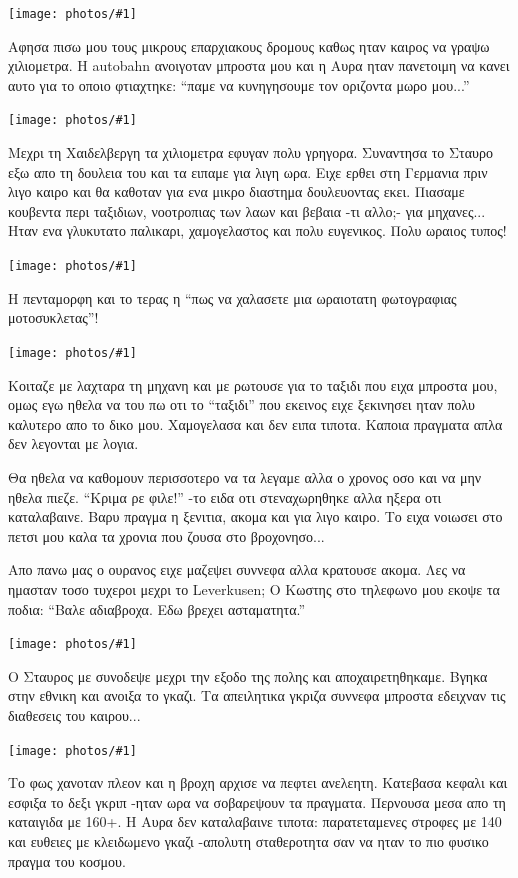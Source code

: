 \documentclass[11pt, letterpaper]{book}
\newcommand\photo[1]{\begin{center}\noindent\texttt{[image: photos/\#1]}\end{center}}
\begin{document}
\photo{117.jpg}

Αφησα πισω μου τους μικρους επαρχιακους δρομους καθως ηταν καιρος να γραψω χιλιομετρα. Η autobahn ανοιγοταν μπροστα μου και η Αυρα ηταν πανετοιμη να κανει αυτο για το οποιο φτιαχτηκε: ``παμε να κυνηγησουμε τον οριζοντα μωρο μου...''

\photo{118.jpg}

Μεχρι τη Χαιδελβεργη τα χιλιομετρα εφυγαν πολυ γρηγορα. 
Συναντησα το Σταυρο εξω απο τη δουλεια του και τα ειπαμε για λιγη ωρα. Ειχε ερθει στη Γερμανια πριν λιγο καιρο και θα καθοταν για ενα μικρο διαστημα δουλευοντας εκει. Πιασαμε κουβεντα περι ταξιδιων, νοοτροπιας των λαων και βεβαια -τι αλλο;- για μηχανες... Ηταν ενα γλυκυτατο παλικαρι, χαμογελαστος και πολυ ευγενικος. 
Πολυ ωραιος τυπος!

\photo{119.jpg}

Η πενταμορφη και το τερας η ``πως να χαλασετε μια ωραιοτατη φωτογραφιας μοτοσυκλετας''!

\photo{120.jpg}

Κοιταζε με λαχταρα τη μηχανη και με ρωτουσε για το ταξιδι που ειχα μπροστα μου, ομως εγω ηθελα να του πω οτι το ``ταξιδι'' που εκεινος ειχε ξεκινησει ηταν πολυ καλυτερο απο το δικο μου. Xαμογελασα και δεν ειπα τιποτα. Καποια πραγματα απλα δεν λεγονται με λογια.

Θα ηθελα να καθομουν περισσοτερο να τα λεγαμε αλλα ο χρονος οσο και να μην ηθελα πιεζε. 
``Κριμα ρε φιλε!'' -το ειδα οτι στεναχωρηθηκε αλλα ηξερα οτι καταλαβαινε. Βαρυ πραγμα η ξενιτια, ακομα και για λιγο καιρο. Το ειχα νοιωσει στο πετσι μου καλα τα χρονια που ζουσα στο βροχονησο...

Απο πανω μας ο ουρανος ειχε μαζεψει συννεφα αλλα κρατουσε ακομα. Λες να ημασταν τοσο τυχεροι μεχρι το Leverkusen; Ο Κωστης στο τηλεφωνο μου εκοψε τα ποδια: ``Βαλε αδιαβροχα. Εδω βρεχει ασταματητα.''

\photo{121.jpg}

Ο Σταυρος με συνοδεψε μεχρι την εξοδο της πολης και αποχαιρετηθηκαμε. Βγηκα στην εθνικη και ανοιξα το γκαζι. Τα απειλητικα γκριζα συννεφα μπροστα εδειχναν τις διαθεσεις του καιρου...

\photo{122.jpg}

Το φως χανοταν πλεον και η βροχη αρχισε να πεφτει ανελεητη. Κατεβασα κεφαλι και εσφιξα το δεξι γκριπ -ηταν ωρα να σοβαρεψουν τα πραγματα. 
Περνουσα μεσα απο τη καταιγιδα με 160+. Η Αυρα δεν καταλαβαινε τιποτα: παρατεταμενες στροφες με 140 και ευθειες με κλειδωμενο γκαζι -απολυτη σταθεροτητα σαν να ηταν το πιο φυσικο πραγμα του κοσμου.
\end{document}
